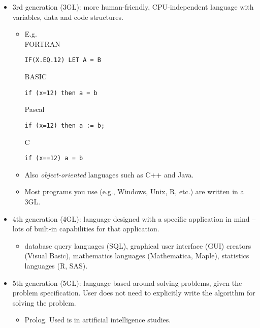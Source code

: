 \documentclass[ignorenonframetext,]{beamer}
\providecommand{\tightlist}{%
  \setlength{\itemsep}{0pt}\setlength{\parskip}{0pt}}
\begin{document}
\begin{frame}[fragile]

\begin{itemize}[<+->]
\tightlist
\item
  3rd generation (3GL): more human-friendly, CPU-independent language
  with variables, data and code structures.

  \begin{itemize}[<+->]
  \item
    E.g.\\
    FORTRAN

\begin{verbatim}
IF(X.EQ.12) LET A = B
\end{verbatim}

    BASIC

\begin{verbatim}
if (x=12) then a = b
\end{verbatim}

    Pascal

\begin{verbatim}
if (x=12) then a := b;
\end{verbatim}

    C

\begin{verbatim}
if (x==12) a = b
\end{verbatim}
  \item
    Also \emph{object-oriented} languages such as C++ and Java.
  \item
    Most programs you use (e.g., Windows, Unix, R, etc.) are written in
    a 3GL.
  \end{itemize}
\end{itemize}

\end{frame}

\begin{frame}

\begin{itemize}[<+->]
\tightlist
\item
  4th generation (4GL): language designed with a specific application in
  mind -- lots of built-in capabilities for that application.

  \begin{itemize}[<+->]
  \tightlist
  \item
    database query languages (SQL), graphical user interface (GUI)
    creators (Visual Basic), mathematics languages (Mathematica, Maple),
    statistics languages (R, SAS).
  \end{itemize}
\item
  5th generation (5GL): language based around solving problems, given
  the problem specification. User does not need to explicitly write the
  algorithm for solving the problem.

  \begin{itemize}[<+->]
  \tightlist
  \item
    Prolog. Used is in artificial intelligence studies.
  \end{itemize}
\end{itemize}

\end{frame}
\end{document}
